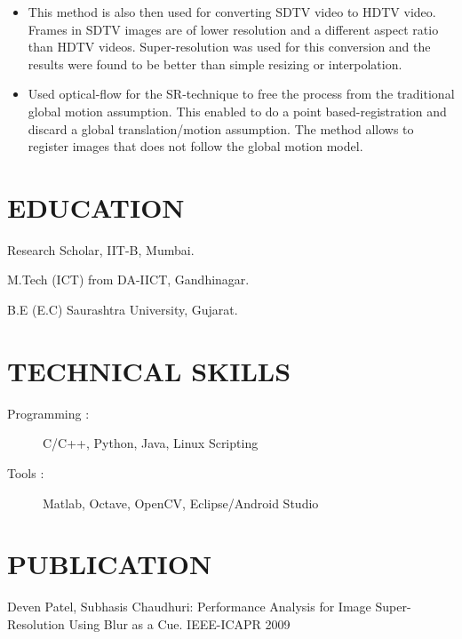 \documentclass{res}
\begin{document}
\begin{resume}
\begin{itemize}
 \item This method is also then used for
converting SDTV video to HDTV video. Frames in SDTV images are of lower resolution and a different aspect ratio than HDTV videos. Super-resolution was used for this conversion and the results were found to be better than simple resizing or interpolation. 
\item  Used optical-flow for  the SR-technique to  free the process  from the traditional global motion assumption. This enabled to do a point based-registration  and discard a global translation/motion assumption. The method allows to register images that does not follow the global motion model. 
\end{itemize}

\section{EDUCATION}          
\begin{description}
 \item    Research Scholar, IIT-B, Mumbai. 
  \item  M.Tech (ICT) from DA-IICT, Gandhinagar.  
   \item     B.E (E.C) Saurashtra University, Gujarat.   
\end{description}    

\section{TECHNICAL SKILLS}          
\begin{description}
\item [Programming      :]  C/C++, Python, Java, Linux Scripting 
\item [Tools            :] Matlab, Octave, OpenCV, Eclipse/Android Studio
\end{description}


\section{PUBLICATION}
\begin{description}
\item   Deven Patel, Subhasis Chaudhuri: Performance Analysis for Image Super-Resolution Using Blur as a Cue. IEEE-ICAPR 2009
\end{description}




\end{resume}
\end{document}
